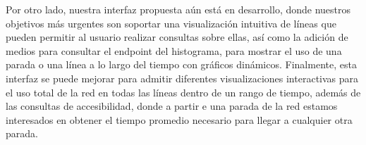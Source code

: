     Por otro lado, nuestra interfaz propuesta a\'un est\'a en desarrollo, donde nuestros objetivos m\'as urgentes son soportar una visualizaci\'on intuitiva de l\'ineas que pueden permitir al usuario realizar consultas sobre ellas, as\'i como la adici\'on de medios para consultar el endpoint del histograma, para mostrar el uso de una parada o una l\'inea a lo largo del tiempo con gr\'aficos din\'amicos. Finalmente, esta interfaz se puede mejorar para admitir diferentes visualizaciones interactivas para el uso total de la red en todas las l\'ineas dentro de un rango de tiempo, adem\'as de las consultas de accesibilidad, donde a partir e una parada de la red estamos interesados en obtener el tiempo promedio necesario para llegar a cualquier otra parada.